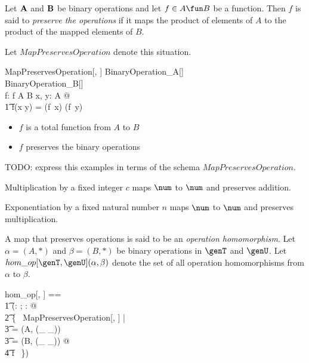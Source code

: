 \documentclass{amsart}
\begin{document}
Let $\mathbf{A}$ and $\mathbf{B}$ be binary operations and let $f \in A \fun B$ be a function.
Then $f$ is said to {\em preserve the operations} if it maps the product of elements of $A$ to 
the product of the mapped elements of $B$.

Let $MapPreservesOperation$ denote this situation.
\begin{schema}{MapPreservesOperation}[\genT, \genU]
	BinaryOperation\_A[\genT] \\
	BinaryOperation\_B[\genU] \\
	f: \genT \pfun \genU
\where
	f \in A \fun B
\also
	\forall x, y: A @ \\
	\t1	f(x \mulA y) = (f~x) \mulB (f~y)
\end{schema}
\begin{itemize}
	\item $f$ is a total function from $A$ to $B$
	\item $f$ preserves the binary operations
\end{itemize}

TODO: express this examples in terms of the schema $MapPreservesOperation$.

\begin{example}
Multiplication by a fixed integer $c$ maps $\num$ to $\num$ and preserves addition.
\end{example}

\begin{example}
Exponentiation by a fixed natural number $n$ maps $\num$ to $\num$ and preserves multiplication.
\end{example}

A map that preserves operations is said to be an \textit{operation homomorphism}.
Let $\alpha = (A, *)$ and $\beta = (B, *)$ be binary operations in $\genT$ and $\genU$. 
Let $hom\_op[\genT, \genU](\alpha,\beta)$ denote the set of all operation homomorphisms from $\alpha$ to $\beta$.

\begin{zed}
	hom\_op[\genT, \genU] == \\
	\t1	(\lambda \alpha: \binop \genT; \beta: \binop \genU @ \\
	\t2		\{~ MapPreservesOperation[\genT, \genU] | \\
	\t3			\alpha = (A, (\_ \mulA \_)) \land \\
	\t3			\beta = (B, (\_ \mulB \_)) @ \\
	\t4				f ~\})
\end{zed}
\end{document}
